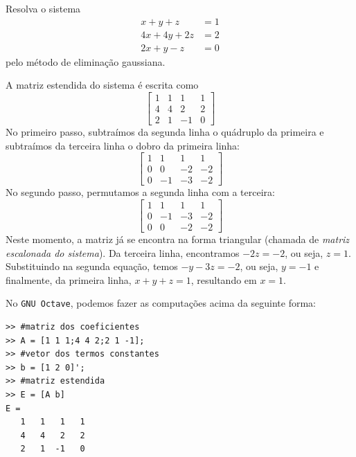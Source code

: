 \begin{ex}\label{ex:elim_gaussiana} Resolva o sistema
  \begin{equation}
    \begin{split}
      x+y+z  &= 1\\
      4x+4y+2z&= 2\\
      2x+y-z &= 0
    \end{split}
  \end{equation}
pelo método de eliminação gaussiana.
\end{ex}
\begin{sol}
A matriz estendida do sistema é escrita como
\begin{equation}
  \begin{bmatrix}
      1 &1& 1&1\\
      4 & 4 &2&2\\
      2 &1& -1&0
  \end{bmatrix}
\end{equation}
No primeiro passo, subtraímos da segunda linha o quádruplo da primeira e subtraímos da terceira linha o dobro da primeira linha:
\begin{equation}
  \begin{bmatrix}
       1 &1& 1&1\\
       0 & 0 &-2&-2\\
       0 &-1& -3&-2
  \end{bmatrix}
\end{equation}
No segundo passo, permutamos a segunda linha com a terceira:
\begin{equation}
  \begin{bmatrix}
       1 &1& 1&1\\
       0 &-1& -3&-2\\
       0 & 0 &-2&-2
  \end{bmatrix}
\end{equation}
Neste momento, a matriz já se encontra na forma triangular (chamada de \emph{matriz escalonada do sistema}). Da terceira linha, encontramos $-2z=-2$, ou seja, $z=1$. Substituindo na segunda equação, temos $-y-3z=-2$, ou seja, $y=-1$ e finalmente, da primeira linha, $x+y+z=1$, resultando em $x=1$.

\ifisoctave
No \verb+GNU Octave+, podemos fazer as computações acima da seguinte forma:
\begin{verbatim}
>> #matriz dos coeficientes
>> A = [1 1 1;4 4 2;2 1 -1];
>> #vetor dos termos constantes
>> b = [1 2 0]';
>> #matriz estendida
>> E = [A b]
E =
   1   1   1   1
   4   4   2   2
   2   1  -1   0


\end{verbatim}
\end{sol}
